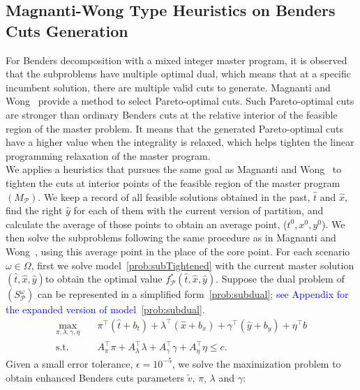 \documentclass[11pt]{article}
\newcommand{\tcb}{\textcolor{blue}}
\begin{document}
	\subsection{Magnanti-Wong Type Heuristics on Benders Cuts Generation} \label{subsec:MW}
	For Benders decomposition with a mixed integer master program, it is observed that the subproblems have multiple optimal dual, which means that at a specific incumbent solution, there are multiple valid cuts to generate. Magnanti and Wong~\cite{magnanti1981accelerating} provide a method to select Pareto-optimal cuts. Such Pareto-optimal cuts are stronger than ordinary Benders cuts at the relative interior of the feasible region of the master problem. It means that the generated Pareto-optimal cuts have a higher value when the integrality is relaxed, which helps tighten the linear programming relaxation of the master program.\\
	\newline
	We applies a heuristics that pursues the same goal as Magnanti and Wong~\cite{magnanti1981accelerating} to tighten the cuts at interior points of the feasible region of the master program \((M_\mathcal{P})\). We keep a record of all feasible solutions obtained in the past, \(\hat{t}\) and \(\hat{x}\), find the right \(\hat{y}\) for each of them with the current version of partition, and calculate the average of those points to obtain an average point, (\(t^0,x^0,y^0\)). We then solve the subproblems following the same procedure as in Magnanti and Wong~\cite{magnanti1981accelerating}, using this average point in the place of the core point. For each scenario \(\omega \in \Omega\), first we solve model~\eqref{prob:subTightened} with the current master solution \((\hat{t},\hat{x},\hat{y})\)to obtain the optimal value \(f^*_{\mathcal{P}}(\hat{t},\hat{x},\hat{y})\). Suppose the dual problem of \((S^\omega_\mathcal{P})\) can be represented in a simplified form~\eqref{prob:subdual}; \tcb{see Appendix for the expanded version of model~\eqref{prob:subdual}.}
	\begin{subequations} \label{prob:subdual}
		\begin{align}
		\max_{\pi,\lambda,\gamma,\eta} \quad & \pi^\top (\hat{t} + b_t) + \lambda^\top (\hat{x} + b_x) + \gamma^\top (\hat{y} + b_y) + \eta^\top b \\
		\text{s.t.} \quad & A^\top_{\pi} \pi + A^\top_{\lambda} \lambda + A^\top_{\gamma} \gamma + A^\top_{\eta} \eta \leq c.
		\end{align}
	\end{subequations}
	Given a small error tolerance, \(\epsilon = 10^{-5}\), we solve the maximization problem to obtain enhanced Benders cuts parameters \(\tilde{v}\), \(\pi\), \(\lambda\) and \(\gamma\):
\end{document}
